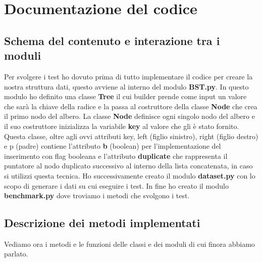 \newpage
\section{Documentazione del codice}

\subsection{Schema del contenuto e interazione tra i moduli}
\label{sec:SchemaContenutoInterazioneModuli_1}
Per svolgere i test ho dovuto prima di tutto implementare il codice per creare la nostra struttura dati, questo avviene al interno del modulo \textbf{BST.py}. In questo modulo ho definito una classe \textbf{Tree}
il cui builder prende come input un valore che sarà la chiave della radice e la passa al costruttore della classe \textbf{Node} che crea il primo nodo del albero.
La classe \textbf{Node} definisce ogni singolo nodo del albero e il suo costruttore inizializza la variabile \textbf{key} al valore che gli è stato fornito. Questa classe, oltre agli ovvi attributi key,
left (figlio sinistro), right (figlio destro) e p (padre) contiene l'attributo \textbf{b} (boolean) per l'implementazione del inserimento con flag booleana e l'attributo \textbf{duplicate} che rappresenta
il puntatore al nodo duplicato successivo al interno della lista concatenata, in caso si utilizzi questa tecnica.
Ho successivamente creato il modulo \textbf{dataset.py} con lo scopo di generare i dati su cui eseguire i test.
In fine ho creato il modulo \textbf{benchmark.py} dove troviamo i metodi che svolgono i test.

\subsection{Descrizione dei metodi implementati}
\label{sec:DescrizioneMetodiImplementati_1}
Vediamo ora i metodi e le funzioni delle classi e dei moduli di cui finora abbiamo parlato. 

